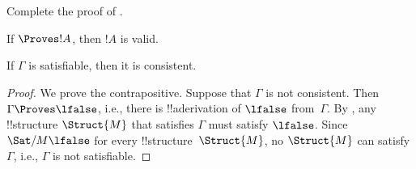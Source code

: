 \documentclass[../../include/open-logic-section]{subfiles}
\begin{document}
\begin{prob}
  Complete the proof of .
\end{prob}

\begin{cor}
If $\Proves !A$, then $!A$ is valid.
\end{cor}

\begin{cor}
If $\Gamma$ is satisfiable, then it is consistent.
\end{cor}

\begin{proof}
We prove the contrapositive.  Suppose that $\Gamma$ is not consistent.
Then $\Gamma \Proves \lfalse$, i.e., there is !!a{derivation} of
$\lfalse$ from~$\Gamma$. By
, any !!{structure} $\Struct{M}$ that satisfies
$\Gamma$ must satisfy $\lfalse$.  Since $\Sat/{M}{\lfalse}$ for every
!!{structure}~$\Struct{M}$, no $\Struct{M}$ can satisfy $\Gamma$,
i.e., $\Gamma$ is not satisfiable.
\end{proof}
\end{document}
